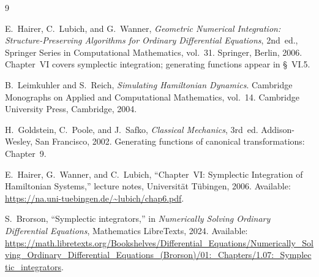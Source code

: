 \documentclass[11pt]{article}
\begin{document}
\begin{thebibliography}{9}

E.~Hairer, C.~Lubich, and G.~Wanner,
\textit{Geometric Numerical Integration: Structure-Preserving Algorithms for
Ordinary Differential Equations}, 2nd~ed.,
Springer Series in Computational Mathematics, vol.~31.
Springer, Berlin, 2006.
Chapter~VI covers symplectic integration; generating functions appear in
\S~VI.5.

B.~Leimkuhler and S.~Reich,
\textit{Simulating Hamiltonian Dynamics}.
Cambridge Monographs on Applied and Computational Mathematics, vol.~14.
Cambridge University Press, Cambridge, 2004.

H.~Goldstein, C.~Poole, and J.~Safko,
\textit{Classical Mechanics}, 3rd~ed.
Addison-Wesley, San Francisco, 2002.
Generating functions of canonical transformations: Chapter~9.

E.~Hairer, G.~Wanner, and C.~Lubich,
``Chapter~VI\@: Symplectic Integration of Hamiltonian Systems,''
lecture notes, Universit\"{a}t T\"{u}bingen, 2006.
Available: \url{https://na.uni-tuebingen.de/~lubich/chap6.pdf}.

S.~Brorson,
``Symplectic integrators,''
in \textit{Numerically Solving Ordinary Differential Equations},
Mathematics LibreTexts, 2024.
Available: \url{https://math.libretexts.org/Bookshelves/Differential_Equations/Numerically_Solving_Ordinary_Differential_Equations_(Brorson)/01:_Chapters/1.07:_Symplectic_integrators}.

\end{thebibliography}
\end{document}
